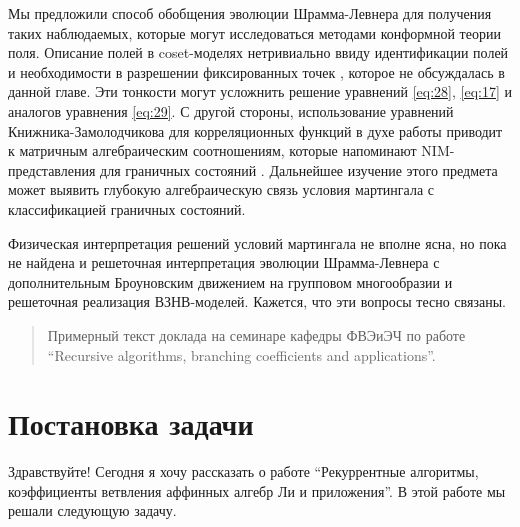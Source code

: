 Мы предложили способ обобщения эволюции Шрамма-Левнера для получения таких наблюдаемых, которые могут исследоваться методами конформной теории поля. Описание полей в coset-моделях нетривиально ввиду идентификации полей \cite{schellekens1990field} и необходимости в разрешении фиксированных точек \cite{Fuchs:1996dd,fuchs1996resolution}, которое не обсуждалась в данной главе. Эти тонкости могут усложнить решение уравнений  \eqref{eq:28}, \eqref{eq:17} и аналогов уравнения \eqref{eq:29}. С другой стороны, использование уравнений Книжника-Замолодчикова  \cite{kogan1997knizhnik} для корреляционных функций в духе работы \cite{alekseev2010sle} приводит к матричным алгебраическим соотношениям, которые напоминают NIM-представления для граничных состояний \cite{ishikawa2003novel}. Дальнейшее изучение этого предмета может выявить глубокую алгебраическую связь условия мартингала с классификацией граничных состояний.

Физическая интерпретация решений условий мартингала не вполне ясна, но пока не найдена и решеточная интерпретация эволюции Шрамма-Левнера с дополнительным Броуновским движением на групповом многообразии \cite{bettelheim2005stochastic} и решеточная реализация ВЗНВ-моделей. Кажется, что эти вопросы тесно связаны.

\newenvironment{comment}
{\par\noindent{\bf Для заинтересованных читателей}\\}
{\\\setlength{10cm}\\\hfill$\scriptstyle\blacksquare$\par}


\begin{abstract}
Примерный текст доклада на семинаре кафедры ФВЭиЭЧ по работе ``Recursive algorithms, branching coefficients and applications''.
\end{abstract}

\section{Постановка задачи}
\label{sec:task}

Здравствуйте!
Сегодня я хочу рассказать о работе ``Рекуррентные алгоритмы, коэффициенты ветвления аффинных алгебр
Ли и приложения''. В этой работе мы решали следующую задачу.

